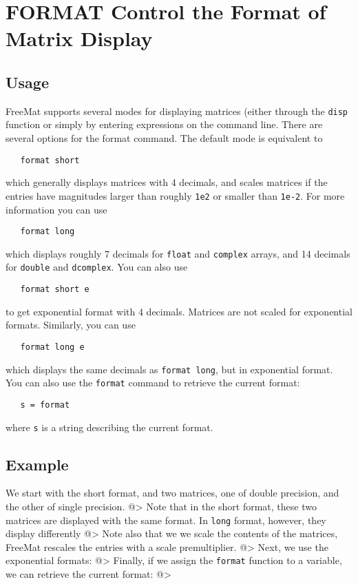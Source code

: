 \section{FORMAT Control the Format of Matrix Display}

\subsection{Usage}

FreeMat supports several modes for displaying matrices (either through the
\verb|disp| function or simply by entering expressions on the command line.  
There are several options for the format command.  The default mode is equivalent
to
\begin{verbatim}
   format short
\end{verbatim}
which generally displays matrices with 4 decimals, and scales matrices if the entries
have magnitudes larger than roughly \verb|1e2| or smaller than \verb|1e-2|.   For more 
information you can use 
\begin{verbatim}
   format long
\end{verbatim}
which displays roughly 7 decimals for \verb|float| and \verb|complex| arrays, and 14 decimals
for \verb|double| and \verb|dcomplex|.  You can also use
\begin{verbatim}
   format short e
\end{verbatim}
to get exponential format with 4 decimals.  Matrices are not scaled for exponential 
formats.  Similarly, you can use
\begin{verbatim}
   format long e
\end{verbatim}
which displays the same decimals as \verb|format long|, but in exponential format.
You can also use the \verb|format| command to retrieve the current format:
\begin{verbatim}
   s = format
\end{verbatim}
where \verb|s| is a string describing the current format.
\subsection{Example}

We start with the short format, and two matrices, one of double precision, and the
other of single precision.
@>
Note that in the short format, these two matrices are displayed with the same format.
In \verb|long| format, however, they display differently
@>
Note also that we we scale the contents of the matrices, FreeMat rescales the entries
with a scale premultiplier.
@>
Next, we use the exponential formats:
@>
Finally, if we assign the \verb|format| function to a variable, we can retrieve the 
current format:
@>
